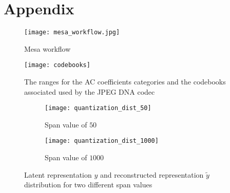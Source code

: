 
\chapter{Appendix}

\begin{figure}
    \centering
    \texttt{[image: mesa\_workflow.jpg]}
    \caption{Mesa workflow}
    \label{fig:mesa_workflow}
\end{figure}

% 

\begin{figure}
    \centering
    \texttt{[image: codebooks]}
    \caption{The ranges for the AC coefficients categories and the codebooks associated used by the JPEG DNA codec}
    \label{fig:codebooks}
\end{figure}

\begin{figure}
    \begin{subfigure}{0.5\textwidth}
        \centering
        \texttt{[image: quantization\_dist\_50]}
        \caption{Span value of $50$}
        \label{fig:quantized-y-50}
    \end{subfigure}
    \begin{subfigure}{0.5\textwidth}
        \centering
        \texttt{[image: quantization\_dist\_1000]}
        \caption{Span value of $1000$}
        \label{fig:quantized-y-1000}
    \end{subfigure}
    \caption{Latent representation $y$ and reconstructed representation $\tilde{y}$ distribution for two different span values}
    \label{fig:quantized-y}
\end{figure}

